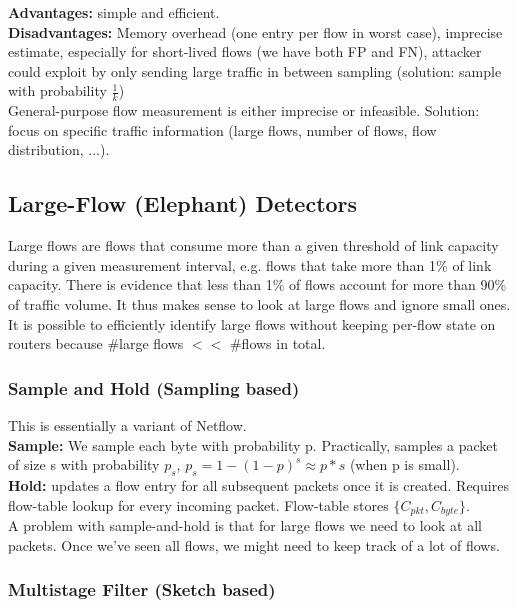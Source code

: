 \documentclass[11pt,oneside,a4paper]{article}
\begin{document}
\newpage

\noindent \textbf{Advantages:} simple and efficient.\\
\textbf{Disadvantages:} Memory overhead (one entry per flow in worst case), imprecise estimate, especially for short-lived flows (we have both FP and FN), attacker could exploit by only sending large traffic in between sampling (solution: sample with probability $\frac{1}{k}$)\\

\noindent General-purpose flow measurement is either imprecise or infeasible. Solution: focus on specific traffic information (large flows, number of flows, flow distribution, ...).

\subsection{Large-Flow (Elephant) Detectors}

Large flows are flows that consume more than a given threshold of link capacity during a given measurement interval, e.g. flows that take more than 1\% of link capacity. There is evidence that less than 1\% of flows account for more than 90\% of traffic volume. It thus makes sense to look at large flows and ignore small ones.\\
It is possible to efficiently identify large flows without keeping per-flow state on routers because \#large flows $<<$ \#flows in total.

\subsubsection{Sample and Hold (Sampling based)}

This is essentially a variant of Netflow.\\
\textbf{Sample:} We sample each byte with probability p. Practically, samples a packet of size s with probability $p_s$, $p_s = 1-(1-p)^s \approx p*s$ (when p is small).\\
\textbf{Hold:} updates a flow entry for all subsequent packets once it is created. Requires flow-table lookup for every incoming packet. Flow-table stores $\{C_{pkt}, C_{byte}\}$.\\

\noindent A problem with sample-and-hold is that for large flows we need to look at all packets. Once we've seen all flows, we might need to keep track of a lot of flows.

\subsubsection{Multistage Filter (Sketch based)}
\end{document}
